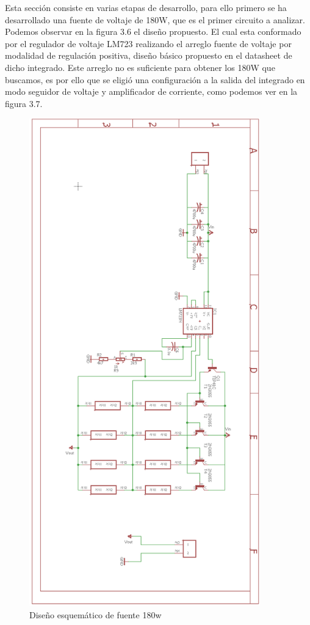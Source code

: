Esta sección consiste en varias etapas de desarrollo, para ello primero se ha desarrollado una fuente de voltaje de 180W, que es el primer circuito a analizar. Podemos observar en la figura 3.6 el diseño propuesto. El cual esta conformado por el regulador de voltaje LM723 realizando el arreglo fuente de voltaje por modalidad de regulación positiva, diseño básico propuesto en el datasheet de dicho integrado. Este arreglo no es suficiente para obtener los 180W que buscamos, es por ello que se eligió una configuración a la salida del integrado en modo seguidor de voltaje y amplificador de corriente, como podemos ver en la figura 3.7.\\

\begin{figure}[H]
\centering
\includegraphics[width=10cm]{Capitulo3/figs/fuente.png}
\caption{Diseño esquemático de fuente 180w}
\end{figure}

